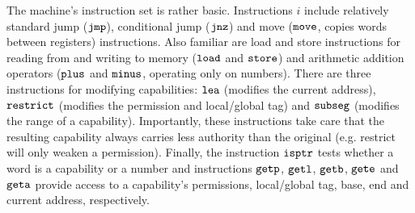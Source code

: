 \documentclass[compsoc,conference,letterpaper,fleqn]{IEEEtran}
\newcommand{\zinstr}[1]{\mathtt{#1}}
\newcommand{\oneinstr}[2]{
  \ifthenelse{\equal{#2}{}}
  {\zinstr{#1}}
  {\zinstr{#1} \; #2}
}
\newcommand{\jmp}[1]{\oneinstr{jmp}{#1}}
\newcommand{\twoinstr}[3]{
  \ifthenelse{\equal{#2#3}{}}
  {\zinstr{#1}}
  {\zinstr{#1} \; #2 \; #3}
}
\newcommand{\restricttwo}[2]{\twoinstr{restrict}{#1}{#2}}
\newcommand{\jnz}[2]{\twoinstr{jnz}{#1}{#2}}
\newcommand{\isptr}[2]{\twoinstr{isptr}{#1}{#2}}
\newcommand{\geta}[2]{\twoinstr{geta}{#1}{#2}}
\newcommand{\getb}[2]{\twoinstr{getb}{#1}{#2}}
\newcommand{\gete}[2]{\twoinstr{gete}{#1}{#2}}
\newcommand{\getp}[2]{\twoinstr{getp}{#1}{#2}}
\newcommand{\getl}[2]{\twoinstr{getl}{#1}{#2}}
\newcommand{\move}[2]{\twoinstr{move}{#1}{#2}}
\newcommand{\store}[2]{\twoinstr{store}{#1}{#2}}
\newcommand{\load}[2]{\twoinstr{load}{#1}{#2}}
\newcommand{\lea}[2]{\twoinstr{lea}{#1}{#2}}
\newcommand{\threeinstr}[4]{
  \ifthenelse{\equal{#2#3#4}{}}
  {\zinstr{#1}}
  {\zinstr{#1} \; #2 \; #3 \; #4}
}
\newcommand{\subseg}[3]{\threeinstr{subseg}{#1}{#2}{#3}}
\newcommand{\plus}[3]{\threeinstr{plus}{#1}{#2}{#3}}
\newcommand{\minus}[3]{\threeinstr{minus}{#1}{#2}{#3}}
\begin{document}
The machine's instruction set is rather basic. Instructions $i$ include
relatively standard jump ($\jmp{}$), conditional jump ($\jnz{}{}$) and move
($\move{}{}$, copies words between registers) instructions. Also familiar are
load and store instructions for reading from and writing to memory ($\load{}{}$
and $\store{}{}$) and arithmetic addition operators ($\plus{}{}{}$ and
$\minus{}{}{}$, operating only on numbers). There are three instructions for
modifying capabilities: $\lea{}{}$ (modifies the current address),
$\restricttwo{}{}$ (modifies the permission and local/global tag) and
$\subseg{}{}{}$ (modifies the range of a capability). Importantly, these
instructions take care that the resulting capability always carries less
authority than the original (e.g. restrict will only weaken a permission).
Finally, the instruction $\isptr{}{}$ tests whether a word is a capability or a
number and instructions $\getp{}{}$, $\getl{}{}$, $\getb{}{}$, $\gete{}{}$ and
$\geta{}{}$ provide access to a capability's permissions, local/global tag, base,
end and current address, respectively.
\end{document}
